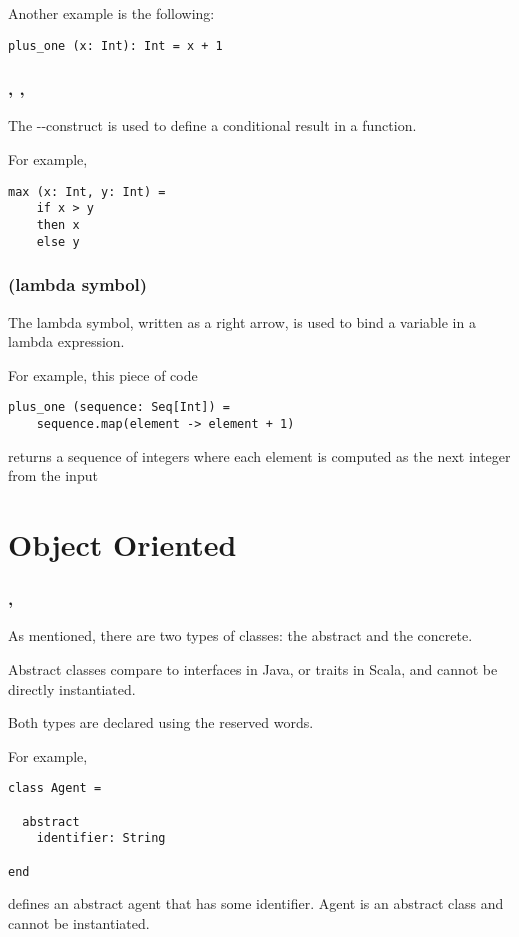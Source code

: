 Another example is the following:
\begin{lstlisting}[label={lst:exampleType02}]
  plus_one (x: Int): Int = x + 1
\end{lstlisting}

\subsubsection{\sodaif, \sodathen, \sodaelse}

The \sodaif-\sodathen-\sodaelse construct is used to define a conditional result in a function.

For example,
\begin{lstlisting}[label={lst:exampleIfThenElse}]
  max (x: Int, y: Int) =
    if x > y
    then x
    else y
\end{lstlisting}

\subsubsection{\sodaarrow (lambda symbol)}

The lambda symbol, written as a right arrow, is used to bind a variable in a lambda expression.

For example, this piece of code
\begin{lstlisting}[label={lst:exampleLambda}]
  plus_one (sequence: Seq[Int]) =
    sequence.map(element -> element + 1)
\end{lstlisting}
returns a sequence of integers where each element is computed as the next integer from the input


\section{Object Oriented}

\subsubsection{\sodaclass, \sodaabstract}

As mentioned, there are two types of classes: the abstract and the concrete.

Abstract classes compare to interfaces in Java, or traits in Scala, and cannot be directly instantiated.

Both types are declared using the \sodaclass reserved words.

For example,
\begin{lstlisting}[label={lst:exampleAbstractClass}]
class Agent =

  abstract
    identifier: String

end
\end{lstlisting}
defines an abstract agent that has some identifier.
Agent is an abstract class and cannot be instantiated.

